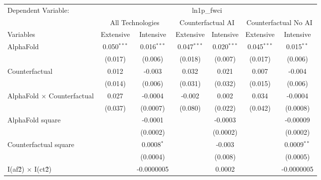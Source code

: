 \begingroup
\centering
\begin{tabular}{lcccccc}
   \tabularnewline \midrule \midrule
   Dependent Variable: & \multicolumn{6}{c}{ln1p\_fwci}\\
 & \multicolumn{2}{c}{All Technologies} & \multicolumn{2}{c}{Counterfactual AI} & \multicolumn{2}{c}{Counterfactual No AI} \\
\cmidrule(lr){1-1}\cmidrule(lr){2-3} \cmidrule(lr){4-5} \cmidrule(lr){6-7}
Variables & \multicolumn{1}{c}{Extensive} & \multicolumn{1}{c}{Intensive} & \multicolumn{1}{c}{Extensive} & \multicolumn{1}{c}{Intensive} & \multicolumn{1}{c}{Extensive} & \multicolumn{1}{c}{Intensive} \\
\cmidrule(lr){1-1}\cmidrule(lr){2-2} \cmidrule(lr){3-3} \cmidrule(lr){4-4} \cmidrule(lr){5-5} \cmidrule(lr){6-6} \cmidrule(lr){7-7}
   AlphaFold                          & 0.050$^{***}$ & 0.016$^{***}$ & 0.047$^{***}$ & 0.020$^{***}$ & 0.045$^{***}$ & 0.015$^{**}$\\   
                                      & (0.017)       & (0.006)       & (0.018)       & (0.007)       & (0.017)       & (0.006)\\   
   Counterfactual                     & 0.012         & -0.003        & 0.032         & 0.021         & 0.007         & -0.004\\   
                                      & (0.014)       & (0.006)       & (0.031)       & (0.032)       & (0.015)       & (0.006)\\   
   AlphaFold $\times$ Counterfactual  & 0.027         & -0.0004       & -0.002        & 0.002         & 0.034         & -0.0004\\   
                                      & (0.037)       & (0.0007)      & (0.080)       & (0.022)       & (0.042)       & (0.0008)\\   
   AlphaFold square                   &               & -0.0001       &               & -0.0003       &               & -0.00009\\   
                                      &               & (0.0002)      &               & (0.0002)      &               & (0.0002)\\   
   Counterfactual square              &               & 0.0008$^{*}$  &               & -0.003        &               & 0.0009$^{**}$\\   
                                      &               & (0.0004)      &               & (0.008)       &               & (0.0005)\\   
   I(af\^2) $\times$ I(ct\^2)         &               & -0.0000005    &               & 0.0002        &               & -0.0000005\\   

\end{tabular}
